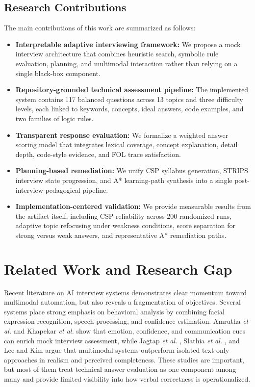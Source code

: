 \documentclass[conference]{IEEEtran}
\begin{document}
\subsection{Research Contributions}
The main contributions of this work are summarized as follows:
\begin{itemize}
    \item \textbf{Interpretable adaptive interviewing framework:} We propose a mock interview architecture that combines heuristic search, symbolic rule evaluation, planning, and multimodal interaction rather than relying on a single black-box component.
    \item \textbf{Repository-grounded technical assessment pipeline:} The implemented system contains 117 balanced questions across 13 topics and three difficulty levels, each linked to keywords, concepts, ideal answers, code examples, and two families of logic rules.
    \item \textbf{Transparent response evaluation:} We formalize a weighted answer scoring model that integrates lexical coverage, concept explanation, detail depth, code-style evidence, and FOL trace satisfaction.
    \item \textbf{Planning-based remediation:} We unify CSP syllabus generation, STRIPS interview state progression, and A* learning-path synthesis into a single post-interview pedagogical pipeline.
    \item \textbf{Implementation-centered validation:} We provide measurable results from the artifact itself, including CSP reliability across 200 randomized runs, adaptive topic refocusing under weakness conditions, score separation for strong versus weak answers, and representative A* remediation paths.
\end{itemize}

\section{Related Work and Research Gap}
Recent literature on AI interview systems demonstrates clear momentum toward multimodal automation, but also reveals a fragmentation of objectives. Several systems place strong emphasis on behavioral analysis by combining facial expression recognition, speech processing, and confidence estimation. Amrutha \textit{et al.} \cite{r1} and Khapekar \textit{et al.} \cite{r5} show that emotion, confidence, and communication cues can enrich mock interview assessment, while Jagtap \textit{et al.} \cite{r6}, Slathia \textit{et al.} \cite{r7}, and Lee and Kim \cite{r8} argue that multimodal systems outperform isolated text-only approaches in realism and perceived completeness. These studies are important, but most of them treat technical answer evaluation as one component among many and provide limited visibility into how verbal correctness is operationalized.
\end{document}
